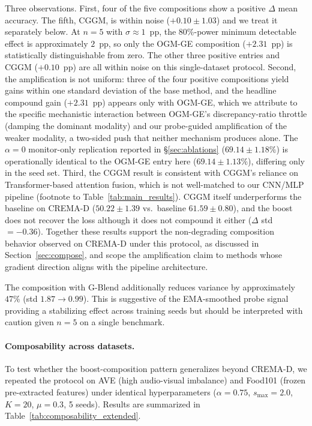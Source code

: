 \documentclass{article}
\begin{document}
Three observations. First, four of the five compositions show a positive $\Delta$ mean accuracy. The fifth, CGGM, is within noise ($+0.10 \pm 1.03$) and we treat it separately below. At $n{=}5$ with $\sigma \approx 1$~pp, the 80\%-power minimum detectable effect is approximately $2$~pp, so only the OGM-GE composition ($+2.31$~pp) is statistically distinguishable from zero. The other three positive entries and CGGM ($+0.10$~pp) are all within noise on this single-dataset protocol. Second, the amplification is not uniform: three of the four positive compositions yield gains within one standard deviation of the base method, and the headline compound gain ($+2.31$~pp) appears only with OGM-GE, which we attribute to the specific mechanistic interaction between OGM-GE's discrepancy-ratio throttle (damping the dominant modality) and our probe-guided amplification of the weaker modality, a two-sided push that neither mechanism produces alone. The $\alpha{=}0$ monitor-only replication reported in \S\ref{sec:ablations} ($69.14 \pm 1.18\%$) is operationally identical to the OGM-GE entry here ($69.14 \pm 1.13\%$), differing only in the seed set. Third, the CGGM result is consistent with CGGM's reliance on Transformer-based attention fusion, which is not well-matched to our CNN/MLP pipeline (footnote to Table~\ref{tab:main_results}). CGGM itself underperforms the baseline on CREMA-D ($50.22 \pm 1.39$ vs.\ baseline $61.59 \pm 0.80$), and the boost does not recover the loss although it does not compound it either ($\Delta$ std $=-0.36$). Together these results support the non-degrading composition behavior observed on CREMA-D under this protocol, as discussed in Section~\ref{sec:compose}, and scope the amplification claim to methods whose gradient direction aligns with the pipeline architecture.

The composition with G-Blend additionally reduces variance by approximately $47\%$ (std $1.87 \to 0.99$). This is suggestive of the EMA-smoothed probe signal providing a stabilizing effect across training seeds but should be interpreted with caution given $n{=}5$ on a single benchmark.

\paragraph{Composability across datasets.} To test whether the boost-composition pattern generalizes beyond CREMA-D, we repeated the protocol on AVE (high audio-visual imbalance) and Food101 (frozen pre-extracted features) under identical hyperparameters ($\alpha{=}0.75$, $s_{\max}{=}2.0$, $K{=}20$, $\mu{=}0.3$, 5 seeds). Results are summarized in Table~\ref{tab:composability_extended}.
\end{document}
